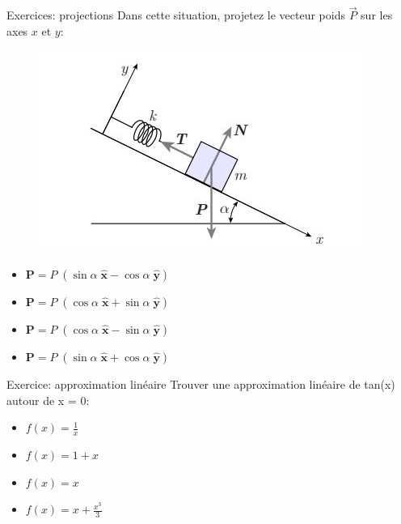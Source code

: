 \documentclass[xcolor=table]{beamer}
\begin{document}
    \begin{frame}{Exercices: projections}
     Dans cette situation, projetez le vecteur poids $\Vec{P}$ sur les axes $x$ et $y$:
    \begin{figure}[H]
        \centering
        \includegraphics[scale=0.5]{Images/projections_kahoot.JPG}
        \label{fig:proj_k}
    \end{figure}
    \begin{itemize}
        \item $\textbf{P} = P\;(\sin{\alpha} \; \hat{\textbf{x}} - \cos{\alpha} \; \hat{\textbf{y}})$ %
        \item $\textbf{P} = P\;(\cos{\alpha} \; \hat{\textbf{x}} + \sin{\alpha} \; \hat{\textbf{y}})$
        \item $\textbf{P} = P\;(\cos{\alpha} \; \hat{\textbf{x}} - \sin{\alpha} \; \hat{\textbf{y}})$
        \item $\textbf{P} = P\;(\sin{\alpha} \; \hat{\textbf{x}} + \cos{\alpha} \; \hat{\textbf{y}})$
    \end{itemize}
        
    \end{frame}
    
    \begin{frame}{Exercice: approximation linéaire}
Trouver une approximation linéaire de tan(x) autour de x = 0:
    \begin{itemize}
        \item $f(x) = \frac{1}{x}$
        \item $f(x) = 1 + x$
        \item $f(x) = x$ %
        \item $f(x) = x + \frac{x^3}{3}$
    \end{itemize}
    
\end{frame}
\end{document}
